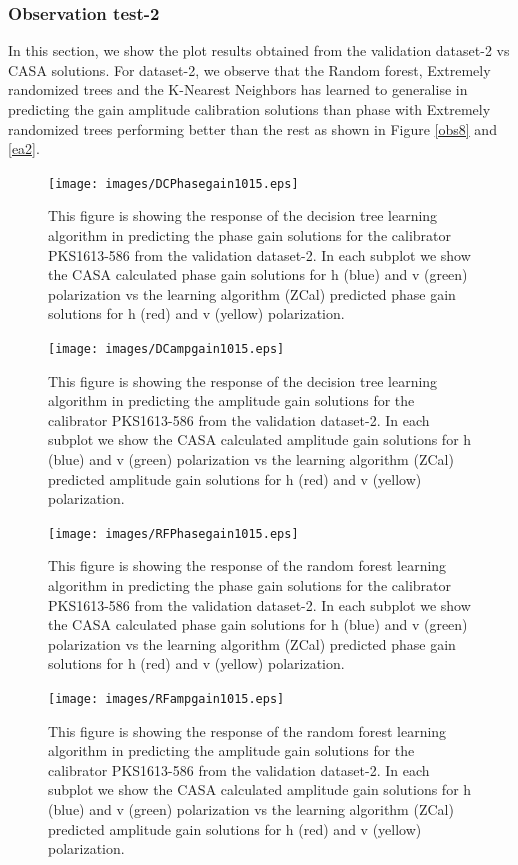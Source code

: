 \subsubsection{Observation test-2}

In this section, we show the plot results obtained from the validation dataset-2 vs CASA solutions. For dataset-2, we observe that the Random forest, Extremely randomized trees and the K-Nearest Neighbors has learned to generalise in predicting the gain amplitude calibration solutions than phase with Extremely randomized trees performing better than the rest as shown in Figure \ref{obs8} and \ref{ea2}.

\begin{figure}[H]
    \texttt{[image: images/DCPhasegain1015.eps]}
    \caption{This figure is showing the response of the decision tree learning algorithm in predicting the phase gain solutions for the calibrator PKS1613-586 from the validation dataset-2. In each subplot we show the CASA calculated phase gain solutions for h (blue) and v (green) polarization vs the learning algorithm (ZCal) predicted phase gain solutions for h (red) and v (yellow) polarization.}
    \label{obs5}
\end{figure}

\begin{figure}[H]
    \texttt{[image: images/DCampgain1015.eps]}
    \caption{This figure is showing the response of the decision tree learning algorithm in predicting the amplitude gain solutions for the calibrator PKS1613-586 from the validation dataset-2. In each subplot we show the CASA calculated amplitude gain solutions for h (blue) and v (green) polarization vs the learning algorithm (ZCal) predicted amplitude gain solutions for h (red) and v (yellow) polarization.}
     \label{da2}
\end{figure}


\begin{figure}[H]
    \texttt{[image: images/RFPhasegain1015.eps]}
    \caption{This figure is showing the response of the random forest learning algorithm in predicting the phase gain solutions for the calibrator PKS1613-586 from the validation dataset-2. In each subplot we show the CASA calculated phase gain solutions for h (blue) and v (green) polarization vs the learning algorithm (ZCal) predicted phase gain solutions for h (red) and v (yellow) polarization.}
    \label{obs6}
\end{figure}

\begin{figure}[H]
    \texttt{[image: images/RFampgain1015.eps]}
    \caption{This figure is showing the response of the random forest learning algorithm in predicting the amplitude gain solutions for the calibrator PKS1613-586 from the validation dataset-2. In each subplot we show the CASA calculated amplitude gain solutions for h (blue) and v (green) polarization vs the learning algorithm (ZCal) predicted amplitude gain solutions for h (red) and v (yellow) polarization.}
     \label{ra2}
\end{figure}

